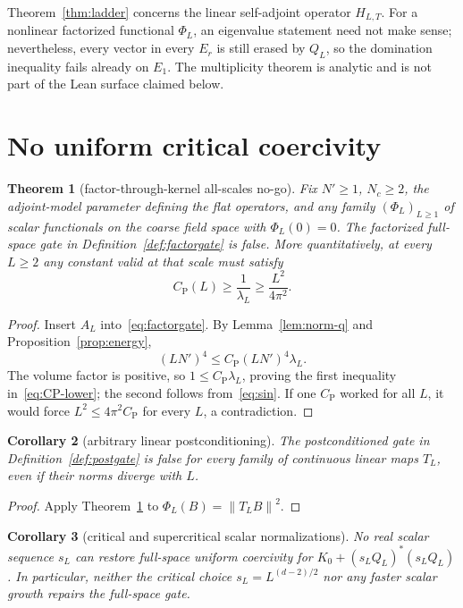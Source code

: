 \documentclass[11pt]{article}
\newtheorem{theorem}{Theorem}[section]
\newtheorem{corollary}[theorem]{Corollary}
\theoremstyle{definition}
\newcommand{\CP}{C_{\mathrm P}}
\newcommand{\norm}[1]{\left\lVert #1\right\rVert}
\begin{document}
Theorem~\ref{thm:ladder} concerns the linear self-adjoint operator
$H_{L,T}$.  For a nonlinear factorized functional $\Phi_L$, an eigenvalue
statement need not make sense; nevertheless, every vector in every $E_r$ is
still erased by $Q_L$, so the domination inequality fails already on $E_1$.
The multiplicity theorem is analytic and is not part of the Lean surface
claimed below.

\section{No uniform critical coercivity}

\begin{theorem}[factor-through-kernel all-scales no-go]\label{thm:nogo}
Fix $N'\ge1$, $N_c\ge2$, the adjoint-model parameter defining the flat
operators, and any family $(\Phi_L)_{L\ge1}$ of scalar functionals on the
coarse field space with $\Phi_L(0)=0$.  The factorized full-space gate in
Definition~\ref{def:factorgate} is false.  More quantitatively, at every
$L\ge2$ any constant valid at that scale must satisfy
\begin{equation}\label{eq:CP-lower}
 \CP(L)\ge\frac{1}{\lambda_L}
 \ge\frac{L^2}{4\pi^2}.
\end{equation}
\end{theorem}

\begin{proof}
Insert $A_L$ into~\eqref{eq:factorgate}.  By Lemma~\ref{lem:norm-q} and
Proposition~\ref{prop:energy},
\[
 (LN')^4\le\CP(LN')^4\lambda_L.
\]
The volume factor is positive, so $1\le\CP\lambda_L$, proving the first
inequality in~\eqref{eq:CP-lower}; the second follows from~\eqref{eq:sin}.
If one $\CP$ worked for all $L$, it would force $L^2\le4\pi^2\CP$ for every
$L$, a contradiction.
\end{proof}

\begin{corollary}[arbitrary linear postconditioning]\label{cor:post}
The postconditioned gate in Definition~\ref{def:postgate} is false for every
family of continuous linear maps $T_L$, even if their norms diverge with $L$.
\end{corollary}

\begin{proof}
Apply Theorem~\ref{thm:nogo} to $\Phi_L(B)=\norm{T_LB}^2$.
\end{proof}

\begin{corollary}[critical and supercritical scalar normalizations]\label{cor:scalar}
No real scalar sequence $s_L$ can restore full-space uniform coercivity for
$K_0+(s_LQ_L)^*(s_LQ_L)$.  In particular, neither the critical choice
$s_L=L^{(d-2)/2}$ nor any faster scalar growth repairs the full-space gate.
\end{corollary}
\end{document}
